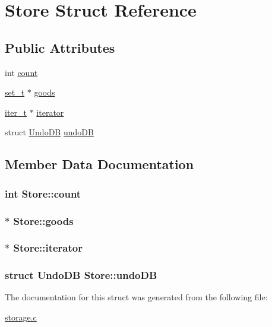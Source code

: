 \hypertarget{structStore}{\section{Store Struct Reference}
\label{structStore}
}
\subsection*{Public Attributes}
\begin{DoxyCompactItemize}
\item 
int \hyperlink{structStore_ad504d4f49d1c4313c120cdfc0e9c70d8}{count}
\item 
\hyperlink{structset__t}{set\-\_\-t} $\ast$ \hyperlink{structStore_aa737b3ad17b635f331dcc24b03cfb6bc}{goods}
\item 
\hyperlink{structiter__t}{iter\-\_\-t} $\ast$ \hyperlink{structStore_afb6cfafc43776d52464f6c66754a7f5b}{iterator}
\item 
struct \hyperlink{structUndoDB}{Undo\-D\-B} \hyperlink{structStore_a735786f7585c2b65381a68c61e1d8d46}{undo\-D\-B}
\end{DoxyCompactItemize}


\subsection{Member Data Documentation}
\hypertarget{structStore_ad504d4f49d1c4313c120cdfc0e9c70d8}{
\subsubsection[{count}]{\setlength{\rightskip}{0pt plus 5cm}int Store\-::count}}\label{structStore_ad504d4f49d1c4313c120cdfc0e9c70d8}
\hypertarget{structStore_aa737b3ad17b635f331dcc24b03cfb6bc}{
\subsubsection[{goods}]{$\ast$ Store\-::goods}}\label{structStore_aa737b3ad17b635f331dcc24b03cfb6bc}
\hypertarget{structStore_afb6cfafc43776d52464f6c66754a7f5b}{
\subsubsection[{iterator}]{$\ast$ Store\-::iterator}}\label{structStore_afb6cfafc43776d52464f6c66754a7f5b}
\hypertarget{structStore_a735786f7585c2b65381a68c61e1d8d46}{
\subsubsection[{undo\-D\-B}]{\setlength{\rightskip}{0pt plus 5cm}struct {\bf Undo\-D\-B} Store\-::undo\-D\-B}}\label{structStore_a735786f7585c2b65381a68c61e1d8d46}


The documentation for this struct was generated from the following file\-:\begin{DoxyCompactItemize}
\item 
\hyperlink{storage_8c}{storage.\-c}\end{DoxyCompactItemize}
